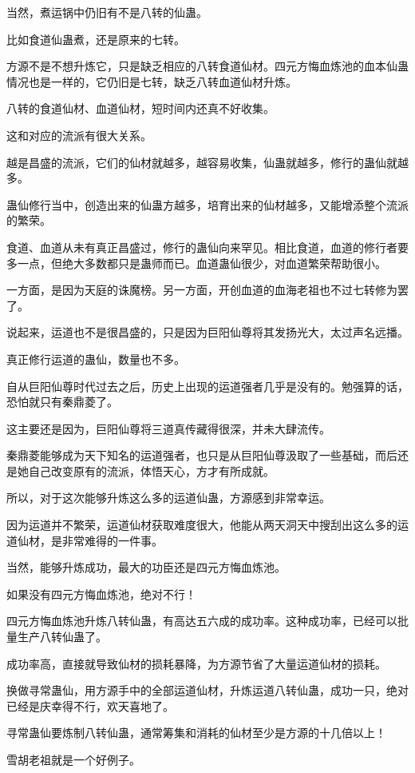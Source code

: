 \begin{this_body}
当然，煮运锅中仍旧有不是八转的仙蛊。

比如食道仙蛊煮，还是原来的七转。

方源不是不想升炼它，只是缺乏相应的八转食道仙材。四元方悔血炼池的血本仙蛊情况也是一样的，它仍旧是七转，缺乏八转血道仙材升炼。

八转的食道仙材、血道仙材，短时间内还真不好收集。

这和对应的流派有很大关系。

越是昌盛的流派，它们的仙材就越多，越容易收集，仙蛊就越多，修行的蛊仙就越多。

蛊仙修行当中，创造出来的仙蛊方越多，培育出来的仙材越多，又能增添整个流派的繁荣。

食道、血道从未有真正昌盛过，修行的蛊仙向来罕见。相比食道，血道的修行者要多一点，但绝大多数都只是蛊师而已。血道蛊仙很少，对血道繁荣帮助很小。

一方面，是因为天庭的诛魔榜。另一方面，开创血道的血海老祖也不过七转修为罢了。

说起来，运道也不是很昌盛的，只是因为巨阳仙尊将其发扬光大，太过声名远播。

真正修行运道的蛊仙，数量也不多。

自从巨阳仙尊时代过去之后，历史上出现的运道强者几乎是没有的。勉强算的话，恐怕就只有秦鼎菱了。

这主要还是因为，巨阳仙尊将三道真传藏得很深，并未大肆流传。

秦鼎菱能够成为天下知名的运道强者，也只是从巨阳仙尊汲取了一些基础，而后还是她自己改变原有的流派，体悟天心，方才有所成就。

所以，对于这次能够升炼这么多的运道仙蛊，方源感到非常幸运。

因为运道并不繁荣，运道仙材获取难度很大，他能从两天洞天中搜刮出这么多的运道仙材，是非常难得的一件事。

当然，能够升炼成功，最大的功臣还是四元方悔血炼池。

如果没有四元方悔血炼池，绝对不行！

四元方悔血炼池升炼八转仙蛊，有高达五六成的成功率。这种成功率，已经可以批量生产八转仙蛊了。

成功率高，直接就导致仙材的损耗暴降，为方源节省了大量运道仙材的损耗。

换做寻常蛊仙，用方源手中的全部运道仙材，升炼运道八转仙蛊，成功一只，绝对已经是庆幸得不行，欢天喜地了。

寻常蛊仙要炼制八转仙蛊，通常筹集和消耗的仙材至少是方源的十几倍以上！

雪胡老祖就是一个好例子。


\end{this_body}
